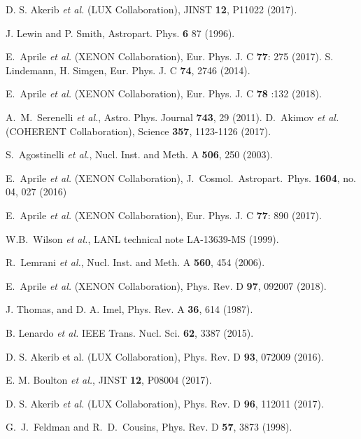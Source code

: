 \begin{thebibliography}{24}
 D. S. Akerib {\it et al.} (LUX Collaboration), JINST \textbf{12}, P11022 (2017).

 J. Lewin and P. Smith, Astropart. Phys. \textbf{6} 87 (1996).

 E.~Aprile {\it et al.} (XENON Collaboration), Eur. Phys. J. C \textbf{77}: 275 (2017). %
 S. Lindemann, H. Simgen, Eur. Phys. J. C \textbf{74}, 2746 (2014). %

 E.~Aprile {\it et al.} (XENON Collaboration),	Eur. Phys. J. C \textbf{78} :132 (2018). %

 A.~M.~Serenelli {\it et al.}, Astro. Phys. Journal \textbf{743}, 29 (2011). %
 D.~Akimov {\it et al.} (COHERENT Collaboration), Science \textbf{357}, 1123-1126 (2017). %

 S.~Agostinelli {\it et al.}, Nucl. Inst. and Meth. A \textbf{506}, 250 (2003).

 E.~Aprile {\it et al.} (XENON Collaboration), J.\ Cosmol.\ Astropart.\ Phys. \textbf{1604}, no. 04, 027 (2016)

 E.~Aprile {\it et al.} (XENON Collaboration), Eur. Phys. J. C \textbf{77}: 890 (2017). 

 W.B.~Wilson {\it et al.}, LANL technical note LA-13639-MS (1999). 

 R.~Lemrani {\it et al.}, Nucl. Inst. and Meth. A \textbf{560}, 454 (2006). %

 E.~Aprile {\it et al.} (XENON Collaboration), Phys. Rev. D \textbf{97}, 092007 (2018). 


 J. Thomas, and D. A. Imel, Phys. Rev. A \textbf{36}, 614 (1987).

 B. Lenardo {\it et al.} IEEE Trans. Nucl. Sci. \textbf{62}, 3387 (2015).

 D. S. Akerib et al. (LUX Collaboration), Phys. Rev. D \textbf{93}, 072009 (2016).

 E. M. Boulton {\it et al.}, JINST \textbf{12}, P08004 (2017).

 D. S. Akerib {\it et al.} (LUX Collaboration), Phys. Rev. D \textbf{96}, 112011 (2017).

 G.~J.~Feldman and R.~D.~Cousins, Phys. Rev. D {\bf 57}, 3873 (1998).


\end{thebibliography}
